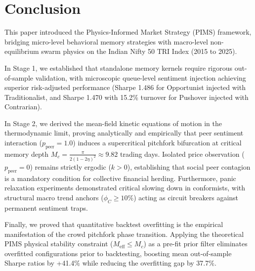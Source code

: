 \section{Conclusion}

This paper introduced the Physics-Informed Market Strategy (PIMS) framework, bridging micro-level behavioral memory strategies with macro-level non-equilibrium swarm physics on the Indian Nifty 50 TRI Index (2015 to 2025).

In Stage 1, we established that standalone memory kernels require rigorous out-of-sample validation, with microscopic queue-level sentiment injection achieving superior risk-adjusted performance (Sharpe 1.486 for Opportunist injected with Traditionalist, and Sharpe 1.470 with 15.2\% turnover for Pushover injected with Contrarian).

In Stage 2, we derived the mean-field kinetic equations of motion in the thermodynamic limit, proving analytically and empirically that peer sentiment interaction ($p_{\text{peer}}=1.0$) induces a supercritical pitchfork bifurcation at critical memory depth $M_c = \frac{\pi}{2(1-2\eta)^2} \approx 9.82$ trading days. Isolated price observation ($p_{\text{peer}}=0$) remains strictly ergodic ($k > 0$), establishing that social peer contagion is a mandatory condition for collective financial herding. Furthermore, panic relaxation experiments demonstrated critical slowing down in conformists, with structural macro trend anchors ($\phi_C \ge 10\%$) acting as circuit breakers against permanent sentiment traps.

Finally, we proved that quantitative backtest overfitting is the empirical manifestation of the crowd pitchfork phase transition. Applying the theoretical PIMS physical stability constraint ($M_{\text{eff}} \le M_c$) as a pre-fit prior filter eliminates overfitted configurations prior to backtesting, boosting mean out-of-sample Sharpe ratios by +41.4\% while reducing the overfitting gap by 37.7\%.
